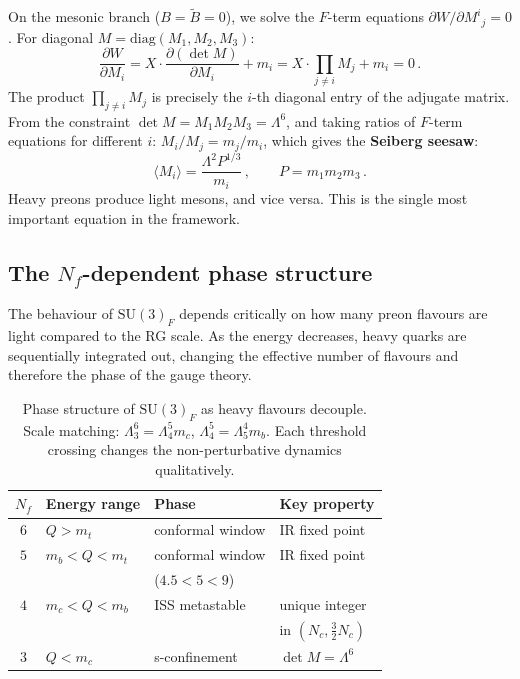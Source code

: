 \documentclass[aps,prd,twocolumn,showpacs,preprintnumbers,superscriptaddress,floatfix]{revtex4-2}
\newcommand{\SU}{\mathrm{SU}}
\newcommand{\Nf}{N_{\!f}}
\newcommand{\Nc}{N_{\!c}}
\newcommand{\diag}{\mathrm{diag}}
\begin{document}
On the mesonic branch ($B = \tilde{B} = 0$), we solve the
$F$-term equations $\partial W / \partial M^i{}_j = 0$.
For diagonal $M = \diag(M_1, M_2, M_3)$:
\begin{equation}
  \frac{\partial W}{\partial M_i}
  = X \cdot \frac{\partial(\det M)}{\partial M_i} + m_i
  = X \cdot \prod_{j \neq i} M_j + m_i = 0\,.
  \label{eq:Fterm_M}
\end{equation}
The product $\prod_{j \neq i} M_j$ is precisely the $i$-th
diagonal entry of the adjugate matrix.
From the constraint $\det M = M_1 M_2 M_3 = \Lambda^6$,
and taking ratios of $F$-term equations for different $i$:
$M_i/M_j = m_j/m_i$, which gives the \textbf{Seiberg seesaw}:
\begin{equation}
  \langle M_i \rangle = \frac{\Lambda^2 P^{1/3}}{m_i}\,,
  \qquad P = m_1 m_2 m_3\,.
  \label{eq:vacuum}
\end{equation}
Heavy preons produce light mesons, and vice versa.
This is the single most important equation in the framework.


\subsection{The $\Nf$-dependent phase structure}

The behaviour of $\SU(3)_F$ depends critically on how many preon
flavours are light compared to the RG scale.
As the energy decreases, heavy quarks are sequentially integrated
out, changing the effective number of flavours and therefore the
phase of the gauge theory.

\begin{table}
\centering\small
\caption{Phase structure of $\SU(3)_F$ as heavy flavours decouple.
  Scale matching: $\Lambda_3^6 = \Lambda_4^5 m_c$,
  $\Lambda_4^5 = \Lambda_5^4 m_b$.
  Each threshold crossing changes the non-perturbative dynamics
  qualitatively.}
\label{tab:phases}
\begin{tabular}{clll}
\hline
$\Nf$ & Energy range & Phase & Key property \\
\hline
$6$ & $Q > m_t$ & conformal window & IR fixed point \\
$5$ & $m_b < Q < m_t$ & conformal window & IR fixed point \\
  &  & ($4.5 < 5 < 9$) & \\
$4$ & $m_c < Q < m_b$ & ISS metastable~\cite{ISS:2006} & unique integer \\
  &  & & in $(\Nc, \tfrac{3}{2}\Nc)$ \\
$3$ & $Q < m_c$ & s-confinement & $\det M = \Lambda^6$ \\
\hline
\end{tabular}
\end{table}
\end{document}
